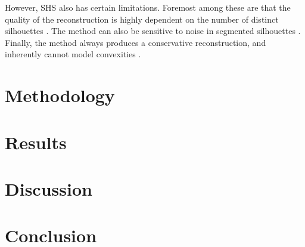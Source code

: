 However, SHS also has certain limitations. Foremost among these are that the quality of the reconstruction is highly dependent on the number of distinct silhouettes \cite{cheung_2005}. The method can also be sensitive to noise in segmented silhouettes \cite{lovell_2023b}. Finally, the method always produces a conservative reconstruction, and inherently cannot model convexities \cite{cheung_2005}.

\newpage
\section{Methodology}

\section{Results}

\section{Discussion}

\section{Conclusion}